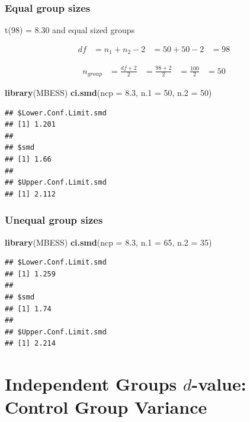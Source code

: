 \documentclass[
]{krantz}
\makeatletter
\newenvironment{Shaded}{\begin{snugshade}}{\end{snugshade}}
\newcommand{\DataTypeTok}[1]{\textcolor[rgb]{0.27,0.27,0.27}{#1}}
\newcommand{\DecValTok}[1]{\textcolor[rgb]{0.06,0.06,0.06}{#1}}
\newcommand{\FloatTok}[1]{\textcolor[rgb]{0.06,0.06,0.06}{#1}}
\newcommand{\KeywordTok}[1]{\textcolor[rgb]{0.27,0.27,0.27}{\textbf{#1}}}
\newcommand{\NormalTok}[1]{#1}
\newenvironment{kframe}{%
\medskip{}
\setlength{\fboxsep}{.8em}
 \def\at@end@of@kframe{}%
 \ifinner\ifhmode%
  \def\at@end@of@kframe{\end{minipage}}%
  \begin{minipage}{\columnwidth}%
 \fi\fi%
 \def\FrameCommand##1{\hskip\@totalleftmargin \hskip-\fboxsep
 \colorbox{shadecolor}{##1}\hskip-\fboxsep
     \hskip-\linewidth \hskip-\@totalleftmargin \hskip\columnwidth}%
 \MakeFramed {\advance\hsize-\width
   \@totalleftmargin\z@ \linewidth\hsize
   \@setminipage}}%
 {\par\unskip\endMakeFramed%
 \at@end@of@kframe}
\renewenvironment{Shaded}{\begin{kframe}}{\end{kframe}}
\makeatother
\begin{document}
\hypertarget{equal-group-sizes}{%
\subsubsection{Equal group sizes}\label{equal-group-sizes}}

t(98) = 8.30 and equal sized groups

\[
\begin{aligned}
df &= n_1 + n_2 - 2
&= 50 + 50 -2
&= 98
\end{aligned}
\]

\[
\begin{aligned}
n_{group} &= \frac{df + 2}{2}
&= \frac{98 + 2}{2}
&= \frac{100}{2}
&= 50
\end{aligned}
\]

\begin{Shaded}
\begin{Highlighting}[]
\KeywordTok{library}\NormalTok{(MBESS)}
\KeywordTok{ci.smd}\NormalTok{(}\DataTypeTok{ncp =} \FloatTok{8.3}\NormalTok{, }\DataTypeTok{n.1 =} \DecValTok{50}\NormalTok{, }\DataTypeTok{n.2 =} \DecValTok{50}\NormalTok{) }
\end{Highlighting}
\end{Shaded}

\begin{verbatim}
## $Lower.Conf.Limit.smd
## [1] 1.201
## 
## $smd
## [1] 1.66
## 
## $Upper.Conf.Limit.smd
## [1] 2.112
\end{verbatim}

\hypertarget{unequal-group-sizes}{%
\subsubsection{Unequal group sizes}\label{unequal-group-sizes}}

\begin{Shaded}
\begin{Highlighting}[]
\KeywordTok{library}\NormalTok{(MBESS)}
\KeywordTok{ci.smd}\NormalTok{(}\DataTypeTok{ncp =} \FloatTok{8.3}\NormalTok{, }\DataTypeTok{n.1 =} \DecValTok{65}\NormalTok{, }\DataTypeTok{n.2 =} \DecValTok{35}\NormalTok{) }
\end{Highlighting}
\end{Shaded}

\begin{verbatim}
## $Lower.Conf.Limit.smd
## [1] 1.259
## 
## $smd
## [1] 1.74
## 
## $Upper.Conf.Limit.smd
## [1] 2.214
\end{verbatim}

\hypertarget{independent-groups-d-value-control-group-variance}{%
\section{\texorpdfstring{Independent Groups \(d\)-value: Control Group Variance}{Independent Groups d-value: Control Group Variance}}\label{independent-groups-d-value-control-group-variance}}
\end{document}

